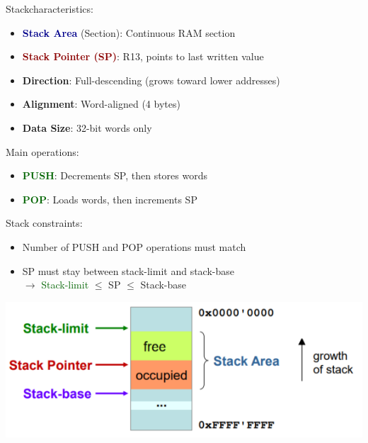 \begin{definition}{Stack}characteristics:
\begin{itemize}
  \item \textcolor{darkblue}{\textbf{Stack Area}} (Section): Continuous RAM section
  \item \textcolor{darkred}{\textbf{Stack Pointer (SP)}}: R13, points to last written value
  \item \textbf{Direction}: Full-descending (grows toward lower addresses)
  \item \textbf{Alignment}: Word-aligned (4 bytes)
  \item \textbf{Data Size}: 32-bit words only
\end{itemize}

Main operations:
\begin{itemize}
  \item \textcolor{darkgreen}{\textbf{PUSH}}: Decrements SP, then stores words
  \item \textcolor{darkgreen}{\textbf{POP}}: Loads words, then increments SP
\end{itemize}

Stack constraints:
\begin{itemize}
  \item Number of PUSH and POP operations must match
  \item SP must stay between stack-limit and stack-base\\
  $\rightarrow$ \textcolor{darkgreen}{Stack-limit} $\leq$ SP $\leq$ \textcolor{darkpurple}{Stack-base}
\end{itemize}

\includegraphics[width=\linewidth]{images/stack_overview.png}


\end{definition}

